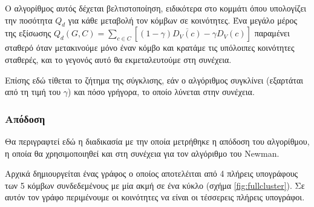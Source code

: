 \documentclass[12pt, letterpaper]{article}
\newcommand{\en}{\selectlanguage{english}}
\newcommand{\gr}{\selectlanguage{greek}}
\begin{document}
Ο αλγορίθμος αυτός δέχεται βελτιστοποίηση, ειδικότερα στο κομμάτι όπου 
υπολογίζει την ποσότητα $Q_d$ για κάθε μεταβολή τον κόμβων σε κοινότητες. 
Ένα μεγάλο μέρος της εξίσωσης $Q_d(G,C) = \sum_{c \in C} [(1 - \gamma)\overline{ D_V(c) } - \gamma D_V(c)]$
παραμένει σταθερό όταν μετακινούμε μόνο έναν κόμβο και κρατάμε τις υπόλοιπες κοινότητες
σταθερές, και το γεγονός αυτό θα εκμεταλευτούμε στη συνέχεια.

Επίσης εδώ τίθεται το ζήτημα της σύγκλισης, εάν ο αλγόριθμος συγκλίνει (εξαρτάται από 
τη τιμή του $\gamma$) και πόσο γρήγορα, το οποίο λύνεται στην συνέχεια.


\subsubsection{Απόδοση}

Θα περιγραφτεί εδώ η διαδικασία με την οποία μετρήθηκε η απόδοση του αλγορίθμου, η 
οποία θα χρησιμοποιηθεί και στη συνέχεια για τον αλγόριθμο του \en Newman. \gr

Αρχικά δημιουργείται ένας γράφος ο οποίος αποτελέιται από 4 πλήρεις υπογράφους 
των 5 κόμβων
συνδεδεμένους με μία ακμή σε ένα κύκλο (σχήμα \ref{fig:fullcluster}).
Σε αυτόν τον γράφο περιμένουμε οι κοινότητες να είναι οι τέσσερεις πλήρεις υπογράφοι.
\end{document}
